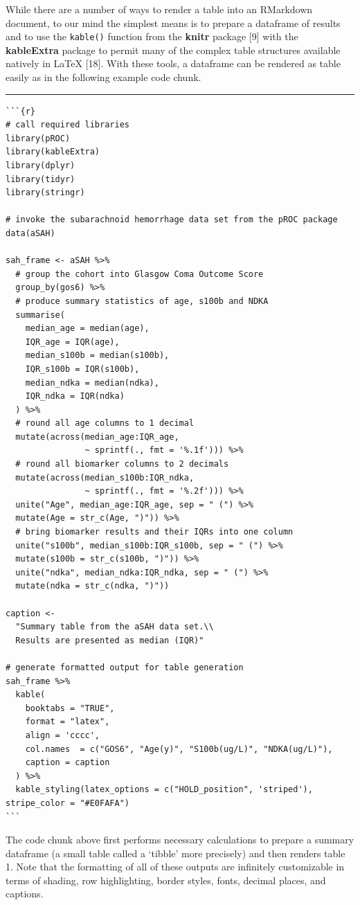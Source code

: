 \documentclass[]{elsarticle} %
\begin{document}
While there are a number of ways to render a table into an RMarkdown
document, to our mind the simplest means is to prepare a dataframe of
results and to use the \texttt{kable()} function from the \textbf{knitr}
package {[}9{]} with the \textbf{kableExtra} package to permit many of
the complex table structures available natively in LaTeX {[}18{]}. With
these tools, a dataframe can be rendered as table easily as in the
following example code chunk.

\begin{center}\rule{0.5\linewidth}{0.5pt}\end{center}

\begin{verbatim}
```{r}
# call required libraries
library(pROC) 
library(kableExtra)
library(dplyr)
library(tidyr)
library(stringr)

# invoke the subarachnoid hemorrhage data set from the pROC package
data(aSAH) 

sah_frame <- aSAH %>%
  # group the cohort into Glasgow Coma Outcome Score 
  group_by(gos6) %>% 
  # produce summary statistics of age, s100b and NDKA
  summarise(
    median_age = median(age), 
    IQR_age = IQR(age),
    median_s100b = median(s100b),
    IQR_s100b = IQR(s100b),
    median_ndka = median(ndka),
    IQR_ndka = IQR(ndka)
  ) %>%
  # round all age columns to 1 decimal
  mutate(across(median_age:IQR_age,
                ~ sprintf(., fmt = '%.1f'))) %>%
  # round all biomarker columns to 2 decimals
  mutate(across(median_s100b:IQR_ndka,
                ~ sprintf(., fmt = '%.2f'))) %>%
  unite("Age", median_age:IQR_age, sep = " (") %>%
  mutate(Age = str_c(Age, ")")) %>%
  # bring biomarker results and their IQRs into one column
  unite("s100b", median_s100b:IQR_s100b, sep = " (") %>%
  mutate(s100b = str_c(s100b, ")")) %>%
  unite("ndka", median_ndka:IQR_ndka, sep = " (") %>%
  mutate(ndka = str_c(ndka, ")"))

caption <-
  "Summary table from the aSAH data set.\\
  Results are presented as median (IQR)"

# generate formatted output for table generation
sah_frame %>%
  kable(
    booktabs = "TRUE",
    format = "latex",
    align = 'cccc',
    col.names  = c("GOS6", "Age(y)", "S100b(ug/L)", "NDKA(ug/L)"),
    caption = caption
  ) %>%
  kable_styling(latex_options = c("HOLD_position", 'striped'), stripe_color = "#E0FAFA")
```
\end{verbatim}

\noindent The code chunk above first performs necessary calculations to
prepare a summary dataframe (a small table called a `tibble' more
precisely) and then renders table 1. Note that the formatting of all of
these outputs are infinitely customizable in terms of shading, row
highlighting, border styles, fonts, decimal places, and captions.
\end{document}
